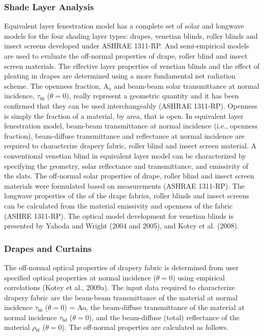 \subsubsection{Shade Layer Analysis}\label{shade-layer-analysis}

Equivalent layer fenestration model has a complete set of solar and longwave models for the four shading layer types: drapes, venetian blinds, roller blinds and insect screens developed under ASHRAE 1311-RP. And semi-empirical models are used to evaluate the off-normal properties of drape, roller blind and insect screen materials. The effective layer properties of venetian blinds and the effect of pleating in drapes are determined using a more fundamental net radiation scheme. The openness fraction, A\(_{o}\) and beam-beam solar transmittance at normal incidence, {$\tau$}\(_{bb}\) ($\theta = 0$), really represent a geometric quantity and it has been confirmed that they can be used interchangeably (ASHRAE 1311-RP). Openness is simply the fraction of a material, by area, that is open. In equivalent layer fenestration model, beam-beam transmittance at normal incidence (i.e., openness fraction), beam-diffuse transmittance and reflectance at normal incidence are required to characterize drapery fabric, roller blind and insect screen material. A conventional venetian blind in equivalent layer model can be characterized by specifying the geometry, solar reflectance and transmittance, and emissivity of the slats. The off-normal solar properties of drape, roller blind and insect screen materials were formulated based on measurements (ASHRAE 1311-RP). The longwave properties of the of the drape fabrics, roller blinds and insect screens can be calculated from the material emissivity and openness of the fabric (ASHRE 1311-RP). The optical model development for venetian blinds is presented by Yahoda and Wright (2004 and 2005), and Kotey et al. (2008).

\subsubsection{Drapes and Curtains}\label{drapes-and-curtains}

The off-normal optical properties of drapery fabric is determined from user specified optical properties at normal incidence ($\theta = 0$) using empirical correlations (Kotey et al., 2009a). The input data required to characterize drapery fabric are the beam-beam transmittance of the material at normal incidence {$\tau$}\(_{bb}\) ($\theta = 0$) = Ao, the beam-diffuse transmittance of the material at normal incidence {$\tau$}\(_{bd}\) ($\theta = 0$), and the beam-diffuse (total) reflectance of the material {$\rho$}\(_{bt}\) ($\theta = 0$). The off-normal properties are calculated as follows.

